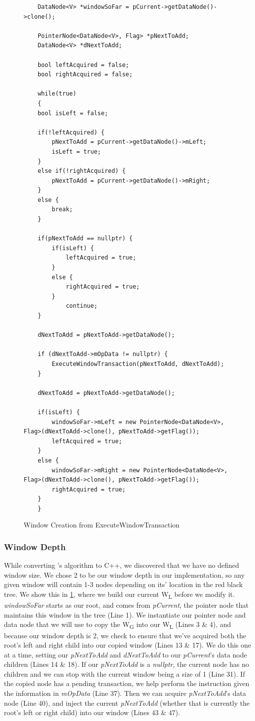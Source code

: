 \documentclass[letterpaper, 10 pt, conference]{ieeeconf}
\begin{document}
\begin{figure}
	\begin{lstlisting}
	DataNode<V> *windowSoFar = pCurrent->getDataNode()->clone();
	
	PointerNode<DataNode<V>, Flag> *pNextToAdd;
	DataNode<V> *dNextToAdd;
	
	bool leftAcquired = false;
	bool rightAcquired = false;
	
	while(true)
	{
	bool isLeft = false;
	
	if(!leftAcquired) {
		pNextToAdd = pCurrent->getDataNode()->mLeft;
		isLeft = true;
	}
	else if(!rightAcquired) {
		pNextToAdd = pCurrent->getDataNode()->mRight;
	}
	else {
		break;
	}
	
	if(pNextToAdd == nullptr) {
		if(isLeft) {
			leftAcquired = true;
		}
		else {
			rightAcquired = true;
		}
			continue;
	}
	
	dNextToAdd = pNextToAdd->getDataNode();
	
	if (dNextToAdd->mOpData != nullptr) {
		ExecuteWindowTransaction(pNextToAdd, dNextToAdd);
	}
	
	dNextToAdd = pNextToAdd->getDataNode();
	
	if(isLeft) {
		windowSoFar->mLeft = new PointerNode<DataNode<V>, Flag>(dNextToAdd->clone(), pNextToAdd->getFlag());
		leftAcquired = true;
	}
	else {
		windowSoFar->mRight = new PointerNode<DataNode<V>, Flag>(dNextToAdd->clone(), pNextToAdd->getFlag());
		rightAcquired = true;
	}
	}
	\end{lstlisting}
	\caption{Window Creation from ExecuteWindowTransaction}
	\label{windowcreation}	
\end{figure}

\subsubsection{Window Depth}
While converting \cite{c1}'s algorithm to C++, we discovered that we have no defined window size. We chose 2 to be our window depth in our implementation, so any given window will contain 1-3 nodes depending on its' location in the red black tree. We show this in \ref{windowcreation}, where we build our current W\textsubscript{L} before we modify it. \textit{windowSoFar} starts as our root, and comes from \textit{pCurrent}, the pointer node that maintains this window in the tree (Line 1). We instantiate our pointer node and data node that we will use to copy the W\textsubscript{G} into our W\textsubscript{L} (Lines 3 \& 4), and because our window depth is 2, we check to ensure that we've acquired both the root's left and right child into our copied window (Lines 13 \& 17). We do this one at a time, setting our \textit{pNextToAdd} and \textit{dNextToAdd} to our \textit{pCurrent}'s data node children (Lines 14 \& 18). If our \textit{pNextToAdd} is a \textit{nullptr}, the current node has no children and we can stop with the current window being a size of 1 (Line 31). If the copied node has a pending transaction, we help perform the instruction given the information in \textit{mOpData} (Line 37). Then we can acquire \textit{pNextToAdd}'s data node (Line 40), and inject the current \textit{pNextToAdd} (whether that is currently the root's left or right child) into our window (Lines 43 \& 47).
\end{document}
